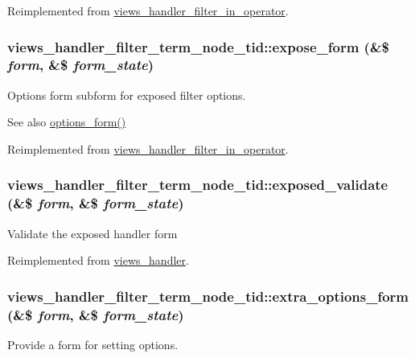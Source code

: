 Reimplemented from \hyperlink{classviews__handler__filter__in__operator_a2c17bde9b5cb3498d31786ba888d545c}{views\_\-handler\_\-filter\_\-in\_\-operator}.\hypertarget{classviews__handler__filter__term__node__tid_abf972bb53512f371af5c1ec32048f686}{
\subsubsection[{expose\_\-form}]{\setlength{\rightskip}{0pt plus 5cm}views\_\-handler\_\-filter\_\-term\_\-node\_\-tid::expose\_\-form (\&\$ {\em form}, \/  \&\$ {\em form\_\-state})}}
\label{classviews__handler__filter__term__node__tid_abf972bb53512f371af5c1ec32048f686}
Options form subform for exposed filter options.

\begin{DoxySeeAlso}{See also}
\hyperlink{classviews__handler__filter_af14c69367162057a32709a6340de0988}{options\_\-form()} 
\end{DoxySeeAlso}


Reimplemented from \hyperlink{classviews__handler__filter__in__operator_a23bfbd98ea5838480365b21e952bf9f4}{views\_\-handler\_\-filter\_\-in\_\-operator}.\hypertarget{classviews__handler__filter__term__node__tid_ab0c4583fea802e86c84fabafc4768074}{
\subsubsection[{exposed\_\-validate}]{\setlength{\rightskip}{0pt plus 5cm}views\_\-handler\_\-filter\_\-term\_\-node\_\-tid::exposed\_\-validate (\&\$ {\em form}, \/  \&\$ {\em form\_\-state})}}
\label{classviews__handler__filter__term__node__tid_ab0c4583fea802e86c84fabafc4768074}
Validate the exposed handler form 

Reimplemented from \hyperlink{classviews__handler_a2dd536754e4764cc82ffe7c864f54b16}{views\_\-handler}.\hypertarget{classviews__handler__filter__term__node__tid_adf599d1bef08003b1b734dfd397030a6}{
\subsubsection[{extra\_\-options\_\-form}]{\setlength{\rightskip}{0pt plus 5cm}views\_\-handler\_\-filter\_\-term\_\-node\_\-tid::extra\_\-options\_\-form (\&\$ {\em form}, \/  \&\$ {\em form\_\-state})}}
\label{classviews__handler__filter__term__node__tid_adf599d1bef08003b1b734dfd397030a6}
Provide a form for setting options. 

